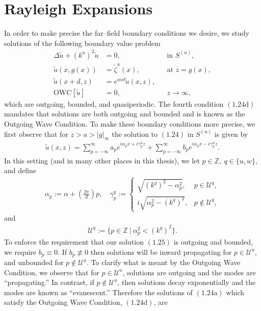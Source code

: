 \section{Rayleigh Expansions}
\label{intro:rayleigh}
In order to make precise the far--field boundary conditions we desire, we study solutions of the following boundary value problem
\begin{subequations}
\begin{align}
\Delta \tilde{u} + (k^u)^2 \tilde{u} &=0,&& \text{in $S^{(u)}$},\\
\tilde{u}(x,g(x))&=\tilde{\zeta}^u(x),&& \text{at $z=g(x)$},\\
\tilde{u}(x+d,z)&=e^{i\alpha d}\tilde{u}(x,z),\\
\text{OWC}[\tilde{u}]&=0,&& z \to\infty,
\end{align}
\end{subequations}
which are outgoing, bounded, and quasiperiodic. The fourth condition $(1.24\text{d})$ mandates that solutions are both outgoing and bounded and is known as the Outgoing Wave Condition. To make these boundary conditions more precise, we first observe that for $z > a > \left| g \right|_{\infty}$ the solution to $(1.24)$ in $S^{(u)}$ is given by
\begin{align}
\tilde{u}(x,z)=\sum_{p=-\infty}^{\infty}a_pe^{i\alpha_px + i\gamma_p^u z}+ \sum_{p=-\infty}^{\infty}b_pe^{i\alpha_px - i\gamma_p^w z}.  
\end{align}
In this setting (and in many other places in this thesis), we let $p\in\mathbb Z, ~q\in\{u,w\},$ and define
\begin{align}
\alpha_p := \alpha + \left(\frac{2\pi}{d}\right)p, \quad \gamma_p^q:= \begin{cases} 
      \sqrt{(k^q)^2-\alpha_p^2}, & p\in\mathcal{U}^q, \\
      i\sqrt{\alpha_p^2-(k^q)^2}, & p\not\in\mathcal{U}^q,
   \end{cases}
\end{align}
and
\begin{align}
\mathcal{U}^q:=\{p\in\mathbb Z ~|~ \alpha_p^2 < (k^q)^2\}.
\end{align}
To enforce the requirement that our solution $(1.25)$ is outgoing and bounded, we require $b_p\equiv 0$. If $b_p\not\equiv 0$ then solutions will be inward propagating for $p\in \mathcal{U}^u$, and unbounded for $p\not \in \mathcal{U}^u$. To clarify what is meant by the Outgoing Wave Condition, we observe that for $p\in\mathcal{U}^u$, solutions are outgoing and the modes are ``propagating.'' In contrast, if $p\not\in\mathcal{U}^u$, then solutions decay exponentially and the modes are known as ``evanescent.'' Therefore the solutions of $(1.24\text{a})$ which satisfy the Outgoing Wave Condition, $(1.24\text{d})$, are
